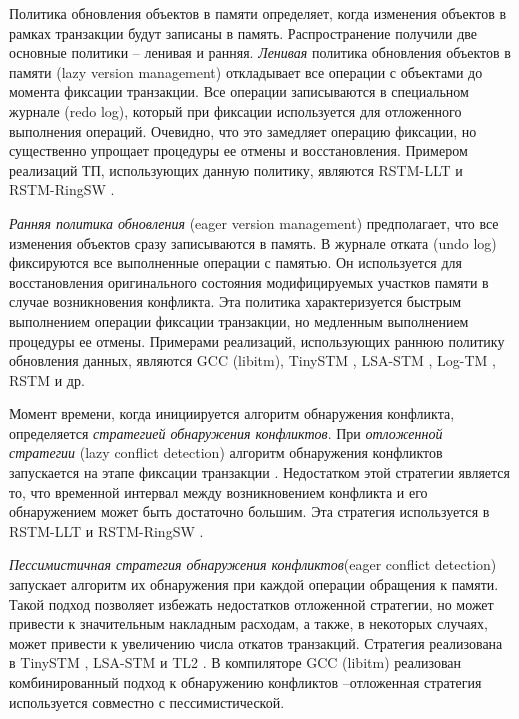 Политика обновления объектов в памяти определяет, когда изменения объектов в рамках транзакции будут записаны в память. Распространение получили две основные политики -- ленивая и ранняя. \textit{Ленивая} политика обновления объектов в памяти (lazy version management) откладывает все операции с объектами до момента фиксации транзакции. Все операции записываются в специальном журнале (redo log), который при фиксации используется для отложенного выполнения операций. Очевидно, что это замедляет операцию фиксации, но существенно упрощает процедуры ее отмены и восстановления. Примером реализаций ТП, использующих данную политику, являются RSTM-LLT \cite{rstm_proj} и RSTM-RingSW \cite{spear_strategy_for_cm, spear_ringstm}.

\textit{Ранняя политика обновления} (eager version management) предполагает, что все изменения объектов сразу записываются в память. В журнале отката (undo log) фиксируются все выполненные операции с памятью. Он используется для восстановления оригинального состояния модифицируемых участков памяти в случае возникновения конфликта. Эта политика характеризуется быстрым выполнением операции фиксации транзакции, но медленным выполнением процедуры ее отмены. Примерами реализаций, использующих раннюю политику обновления данных, являются GCC (libitm), TinySTM \cite{felber_fetzer_marlier_riegel}, LSA-STM \cite{riegel_felber_fetzer}, Log-TM \cite{kevin_bobba_logtm}, RSTM \cite{rstm_proj} и др.
 
Момент времени, когда инициируется алгоритм обнаружения конфликта, определяется \textit{стратегией обнаружения конфликтов}. При \textit{отложенной стратегии} (lazy conflict detection) алгоритм обнаружения конфликтов запускается на этапе фиксации транзакции \cite{spear_ringstm}. Недостатком этой стратегии является то, что временной интервал между возникновением конфликта и его обнаружением может быть достаточно большим. Эта стратегия используется в RSTM-LLT \cite{rstm_proj} и RSTM-RingSW \cite{rstm_proj, spear_strategy_for_cm, spear_ringstm}. 

\textit{Пессимистичная стратегия обнаружения конфликтов}(eager conflict detection) запускает алгоритм их обнаружения при каждой операции обращения к памяти. Такой подход позволяет избежать недостатков отложенной стратегии, но может привести к значительным накладным расходам, а также, в некоторых случаях, может привести к увеличению числа откатов транзакций. Стратегия реализована в TinySTM \cite{felber_fetzer_marlier_riegel}, LSA-STM \cite{riegel_felber_fetzer} и TL2 \cite{dice_shavit_tl2}. В компиляторе GCC (libitm) реализован комбинированный подход к обнаружению конфликтов --отложенная стратегия используется совместно с пессимистической.

